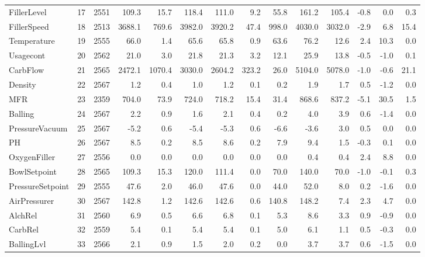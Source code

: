 \documentclass[]{report}
\begin{document}
\begin{table}[H]
\begin{tabular}{lrrrrrrrrrrrrr}
\rowcolor{gray!6}  FillerLevel & 17 & 2551 & 109.3 & 15.7 & 118.4 & 111.0 & 9.2 & 55.8 & 161.2 & 105.4 & -0.8 & 0.0 & 0.3\\
FillerSpeed & 18 & 2513 & 3688.1 & 769.6 & 3982.0 & 3920.2 & 47.4 & 998.0 & 4030.0 & 3032.0 & -2.9 & 6.8 & 15.4\\
\rowcolor{gray!6}  Temperature & 19 & 2555 & 66.0 & 1.4 & 65.6 & 65.8 & 0.9 & 63.6 & 76.2 & 12.6 & 2.4 & 10.3 & 0.0\\
Usagecont & 20 & 2562 & 21.0 & 3.0 & 21.8 & 21.3 & 3.2 & 12.1 & 25.9 & 13.8 & -0.5 & -1.0 & 0.1\\
\addlinespace
\rowcolor{gray!6}  CarbFlow & 21 & 2565 & 2472.1 & 1070.4 & 3030.0 & 2604.2 & 323.2 & 26.0 & 5104.0 & 5078.0 & -1.0 & -0.6 & 21.1\\
Density & 22 & 2567 & 1.2 & 0.4 & 1.0 & 1.2 & 0.1 & 0.2 & 1.9 & 1.7 & 0.5 & -1.2 & 0.0\\
\rowcolor{gray!6}  MFR & 23 & 2359 & 704.0 & 73.9 & 724.0 & 718.2 & 15.4 & 31.4 & 868.6 & 837.2 & -5.1 & 30.5 & 1.5\\
Balling & 24 & 2567 & 2.2 & 0.9 & 1.6 & 2.1 & 0.4 & 0.2 & 4.0 & 3.9 & 0.6 & -1.4 & 0.0\\
\rowcolor{gray!6}  PressureVacuum & 25 & 2567 & -5.2 & 0.6 & -5.4 & -5.3 & 0.6 & -6.6 & -3.6 & 3.0 & 0.5 & 0.0 & 0.0\\
\addlinespace
PH & 26 & 2567 & 8.5 & 0.2 & 8.5 & 8.6 & 0.2 & 7.9 & 9.4 & 1.5 & -0.3 & 0.1 & 0.0\\
\rowcolor{gray!6}  OxygenFiller & 27 & 2556 & 0.0 & 0.0 & 0.0 & 0.0 & 0.0 & 0.0 & 0.4 & 0.4 & 2.4 & 8.8 & 0.0\\
BowlSetpoint & 28 & 2565 & 109.3 & 15.3 & 120.0 & 111.4 & 0.0 & 70.0 & 140.0 & 70.0 & -1.0 & -0.1 & 0.3\\
\rowcolor{gray!6}  PressureSetpoint & 29 & 2555 & 47.6 & 2.0 & 46.0 & 47.6 & 0.0 & 44.0 & 52.0 & 8.0 & 0.2 & -1.6 & 0.0\\
AirPressurer & 30 & 2567 & 142.8 & 1.2 & 142.6 & 142.6 & 0.6 & 140.8 & 148.2 & 7.4 & 2.3 & 4.7 & 0.0\\
\addlinespace
\rowcolor{gray!6}  AlchRel & 31 & 2560 & 6.9 & 0.5 & 6.6 & 6.8 & 0.1 & 5.3 & 8.6 & 3.3 & 0.9 & -0.9 & 0.0\\
CarbRel & 32 & 2559 & 5.4 & 0.1 & 5.4 & 5.4 & 0.1 & 5.0 & 6.1 & 1.1 & 0.5 & -0.3 & 0.0\\
\rowcolor{gray!6}  BallingLvl & 33 & 2566 & 2.1 & 0.9 & 1.5 & 2.0 & 0.2 & 0.0 & 3.7 & 3.7 & 0.6 & -1.5 & 0.0\\
\bottomrule
\end{tabular}
\endgroup{}
\end{table}
\end{document}
